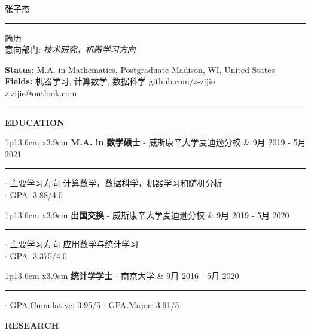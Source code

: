 \documentclass[UTF8,A4]{ctexart}
\newcommand{\cvsection}[1]
{
	\begin{center}
		\large\textcolor{sectcol}{\textbf{#1}}
	\end{center}
}
\newcommand{\metasection}[2]
{
\footnotesize{#2} \hspace*{\fill} \footnotesize{#1}\\[1pt]
}
\newcommand{\cvevent}[3]
{

\begin{tabular*}{1\textwidth}{p{13.6cm}  x{3.9cm}}
	\textbf{#2} - \textcolor{bgcol}{#3} &   \vspace{2.5pt}\textcolor{sectcol}{#1}
\end{tabular*}

\vspace{-8pt}
\textcolor{softcol}{\hrule}
\vspace{6pt}


}
\begin{document}
\pagestyle{fancy}

\vspace{-8pt}
\begin{center}
    \HUGE   \textsc{张子杰}
            \textcolor{sectcol}{\rule[-1mm]{1mm}{0.9cm}}
            \textsc{简历}\\[2pt]
	\small  意向部门: \textit{技术研究，机器学习方向}
\end{center}

\vspace{6pt}

\metasection{Madison, WI, United States}{\textbf{Status:} M.A. in Mathematics, Postgraduate}
\metasection{github.com/z-zijie}{\textbf{Fields:} 机器学习, 计算数学, 数据科学} 
\metasection{z.zijie@outlook.com}{}

\vspace{-2pt}
\textcolor{softcol}{\hrule}
\vspace{6pt}

\normalsize




\cvsection{EDUCATION}

\cvevent{9月 2019 - 5月 2021}
        {M.A. in 数学硕士}
        {威斯康辛大学麦迪逊分校}

        $\cdot$ 主要学习方向 计算数学，数据科学，机器学习和随机分析\\
        $\cdot$ GPA: 3.88/4.0 \\

\cvevent{9月 2019 - 5月 2020}
        {出国交换}
        {威斯康辛大学麦迪逊分校}
        $\cdot$ 主要学习方向 应用数学与统计学习\\
        $\cdot$ GPA: 3.375/4.0 \\

\cvevent{9月 2016 - 5月 2020}
        {统计学学士}
        {南京大学}

        $\cdot$ GPA.Cumulative: 3.95/5
        $\cdot$ GPA.Major: 3.91/5\\


\cvsection{RESEARCH}
\end{document}
